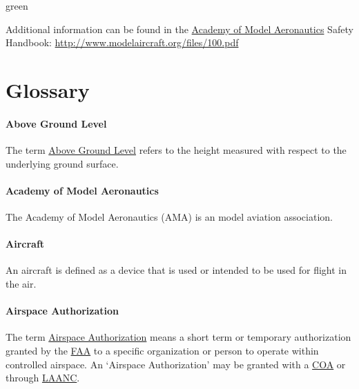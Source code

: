 \documentclass[
]{book}
\newenvironment{content}{\hrulefill}{}{}
\begin{document}
\begin{content-box}{green}
\begin{content}
\end{content}

\end{content-box}

Additional information can be found in the \protect\hyperlink{AMA}{Academy of Model Aeronautics} Safety Handbook: \url{http://www.modelaircraft.org/files/100.pdf}

\hypertarget{glossary}{%
\chapter{Glossary}\label{glossary}}

\hypertarget{AGL}{%
\subsubsection*{Above Ground Level}\label{AGL}}

The term \protect\hyperlink{AGL}{Above Ground Level} refers to the height measured with respect to the underlying ground surface.





\hypertarget{AMA}{%
\subsubsection*{Academy of Model Aeronautics}\label{AMA}}

The Academy of Model Aeronautics (AMA) is an model aviation association.



\hypertarget{aircraft}{%
\subsubsection*{Aircraft}\label{aircraft}}

An aircraft is defined as a device that is used or intended to be used for flight in the air.



\hypertarget{AA}{%
\subsubsection*{Airspace Authorization}\label{AA}}

The term \protect\hyperlink{AA}{Airspace Authorization} means a short term or temporary authorization granted by the \protect\hyperlink{FAA}{FAA} to a specific organization or person to operate within controlled airspace. An `Airspace Authorization' may be granted with a \protect\hyperlink{COA}{COA} or through \protect\hyperlink{LAANC}{LAANC}.
\end{document}
